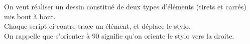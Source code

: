 
\medskip

\begin{multicols}{3}
On veut réaliser un dessin constitué de deux types
d'éléments (tirets et carrés) mis bout à bout.\\
Chaque script ci-contre trace un élément, et déplace le stylo.\\
On rappelle que \og s'orienter à 90 \fg{} signifie qu'on
oriente le stylo vers la droite.


{\small \begin{scratch}
\end{scratch}}


{\small\begin{scratch}
\end{scratch}}
\end{multicols}

